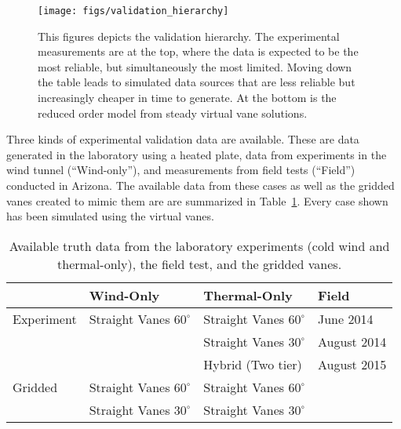 %
%
 \begin{figure}[!htb]
   \begin{center}
    \texttt{[image: figs/validation\_hierarchy]}
    \caption{This figures depicts the validation hierarchy. The
    experimental measurements 
    are at the top, where the data is expected to be the most reliable,
    but simultaneously the most limited. Moving down the table leads to
    simulated data sources that are less reliable but increasingly
    cheaper in time to generate. At the bottom is the reduced order
    model from steady virtual vane solutions.} 
    \label{fig:val_hier}
   \end{center}
 \end{figure}

Three kinds of experimental validation data are available. These are
data generated in the laboratory using a heated plate, data from
experiments in the wind tunnel (``Wind-only''), and measurements from field
tests (``Field'') conducted in Arizona. The available data from
these cases as well as the gridded vanes created to mimic them are are
summarized in Table~\ref{tab:val_data}. Every case shown has been
simulated using the virtual vanes.   

\large
\begin{table}[h]
\centering
\label{my-label}
\begin{tabular}{l|l|l|l|}
           & Wind-Only                   & Thermal-Only                & Field  \\
  \hline 
Experiment & Straight Vanes $60^{\circ}$ & Straight Vanes $60^{\circ}$ & June 2014   \\
           &                           & Straight Vanes $30^{\circ}$   & August 2014 \\
           &                           & Hybrid (Two tier)             & August 2015 \\
  \hline 
Gridded    & Straight Vanes $60^{\circ}$ & Straight Vanes $60^{\circ}$ & \\
           & Straight Vanes $30^{\circ}$ & Straight Vanes $30^{\circ}$ & \\
  \hline 
\end{tabular}
  \caption{Available truth data from the laboratory experiments 
    (cold wind and thermal-only), the field test, and the gridded vanes.} 
  \label{tab:val_data}
\end{table}
%
%
%
%
%

%
%
\normalsize
